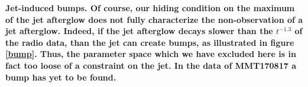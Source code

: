 
\bf{Jet-induced bumps.} Of course, our hiding condition on the maximum of the jet afterglow does not fully characterize the non-observation of a jet afterglow. Indeed, if the jet afterglow decays slower than the $t^{-1.3}$ of the radio data, than the jet can create bumps, as illustrated in figure \ref{bump}. Thus, the parameter space which we have excluded here is in fact too loose of a constraint on the jet. In the data of MMT170817 a bump has yet to be found.


